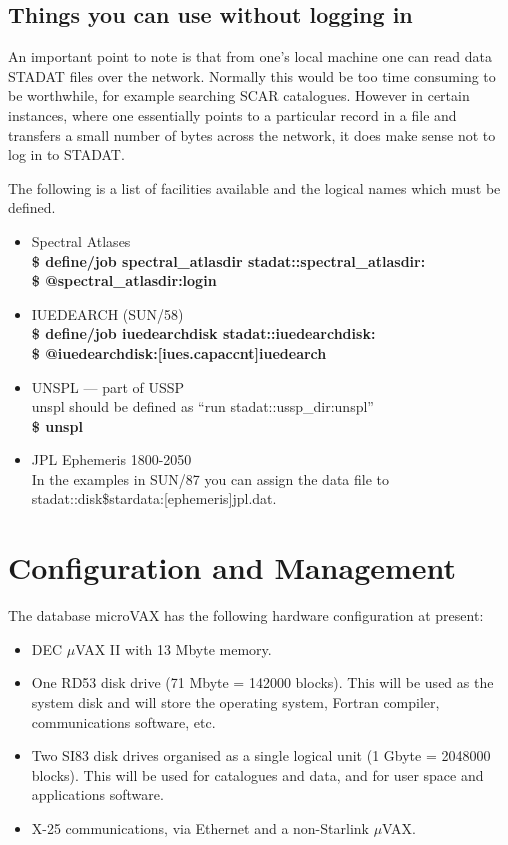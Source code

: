 \subsection{Things you can use without logging in}

An important point to note is that from one's local machine one can
read data STADAT files over the network. Normally this would be
too time consuming to be worthwhile, for example searching SCAR catalogues.
However in certain instances, where one essentially points to a particular
record in a file and transfers a small number of bytes across the network,
it does make sense not to log in to STADAT.

The following is a list of facilities available and the logical names
which must be defined.

\begin{itemize}
\item Spectral Atlases\\
{\bf \$ define/job spectral\_atlasdir stadat::spectral\_atlasdir:\\
\$ @spectral\_atlasdir:login\\ }
\item IUEDEARCH (SUN/58)\\
{\bf \$ define/job iuedearchdisk stadat::iuedearchdisk:\\
\$ @iuedearchdisk:[iues.capaccnt]iuedearch }

\item UNSPL --- part of USSP\\
 unspl should be defined as ``run stadat::ussp\_dir:unspl''\\
{\bf \$ unspl}

\item    JPL Ephemeris 1800-2050  \\
         In the examples in SUN/87 you can assign the data file to
         stadat::disk\$stardata:[ephemeris]jpl.dat.

\end{itemize}



\section{Configuration and Management}

The database microVAX has the following hardware configuration at present:
\begin{itemize}
\item DEC $\mu$VAX II with 13 Mbyte memory.
\item One RD53 disk drive (71 Mbyte = 142000 blocks).
This will be used as the system disk and will store the operating system,
Fortran compiler, communications software, etc.
\item Two SI83 disk drives organised as a single logical unit
(1 Gbyte = 2048000 blocks).
This will be used for catalogues and data, and for user space and
applications software.
\item X-25 communications, via Ethernet and a non-Starlink $\mu$VAX.
\end{itemize}


